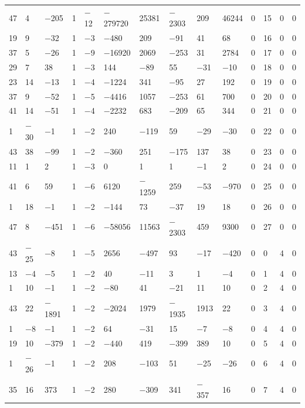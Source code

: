 \documentclass[10pt,a4paper]{amsart}
\numberwithin{equation}{section}
\theoremstyle{definition}
\numberwithin{table}{section}
\begin{document}
{\begin{paracol}{3}
\begin{supertabular}{|w{c}{.32cm}w{c}{.32cm}w{c}{.32cm}@{\hspace{.5cm}}w{c}{.2cm}w{c}{.2cm}|@{\hspace{\tabcolsep}}HHHHHHw{c}{.17cm}w{c}{.17cm}w{c}{.17cm}|}
			47 & 4 & $-$205 & 1 & $-$12 & $-$279720 & 25381 & $-$2303 & 209 & 46244 & 0 & 15 & 0 & 0 \\
			19 & 9 & $-$32 & 1 & $-$3 & $-$480 & 209 & $-$91 & 41 & 68 & 0 & 16 & 0 & 0 \\
			37 & 5 & $-$26 & 1 & $-$9 & $-$16920 & 2069 & $-$253 & 31 & 2784 & 0 & 17 & 0 & 0 \\
			29 & 7 & 38 & 1 & $-$3 & 144 & $-$89 & 55 & $-$31 & $-$10 & 0 & 18 & 0 & 0 \\
			23 & 14 & $-$13 & 1 & $-$4 & $-$1224 & 341 & $-$95 & 27 & 192 & 0 & 19 & 0 & 0 \\
			37 & 9 & $-$52 & 1 & $-$5 & $-$4416 & 1057 & $-$253 & 61 & 700 & 0 & 20 & 0 & 0 \\
			41 & 14 & $-$51 & 1 & $-$4 & $-$2232 & 683 & $-$209 & 65 & 344 & 0 & 21 & 0 & 0 \\
			1 & $-$30 & $-$1 & 1 & $-$2 & 240 & $-$119 & 59 & $-$29 & $-$30 & 0 & 22 & 0 & 0 \\
			43 & 38 & $-$99 & 1 & $-$2 & $-$360 & 251 & $-$175 & 137 & 38 & 0 & 23 & 0 & 0 \\
			11 & 1 & 2 & 1 & $-$3 & 0 & 1 & 1 & $-$1 & 2 & 0 & 24 & 0 & 0 \\
			41 & 6 & 59 & 1 & $-$6 & 6120 & $-$1259 & 259 & $-$53 & $-$970 & 0 & 25 & 0 & 0 \\
			1 & 18 & $-$1 & 1 & $-$2 & $-$144 & 73 & $-$37 & 19 & 18 & 0 & 26 & 0 & 0 \\
			47 & 8 & $-$451 & 1 & $-$6 & $-$58056 & 11563 & $-$2303 & 459 & 9300 & 0 & 27 & 0 & 0 \\
			43 & $-$25 & $-$8 & 1 & $-$5 & 2656 & $-$497 & 93 & $-$17 & $-$420 & 0 & 0 & 4 & 0 \\
			13 & $-$4 & $-$5 & 1 & $-$2 & 40 & $-$11 & 3 & 1 & $-$4 & 0 & 1 & 4 & 0 \\
			1 & 10 & $-$1 & 1 & $-$2 & $-$80 & 41 & $-$21 & 11 & 10 & 0 & 2 & 4 & 0 \\
			43 & 22 & $-$1891 & 1 & $-$2 & $-$2024 & 1979 & $-$1935 & 1913 & 22 & 0 & 3 & 4 & 0 \\
			1 & $-$8 & $-$1 & 1 & $-$2 & 64 & $-$31 & 15 & $-$7 & $-$8 & 0 & 4 & 4 & 0 \\
			19 & 10 & $-$379 & 1 & $-$2 & $-$440 & 419 & $-$399 & 389 & 10 & 0 & 5 & 4 & 0 \\
			1 & $-$26 & $-$1 & 1 & $-$2 & 208 & $-$103 & 51 & $-$25 & $-$26 & 0 & 6 & 4 & 0 \\
			35 & 16 & 373 & 1 & $-$2 & 280 & $-$309 & 341 & $-$357 & 16 & 0 & 7 & 4 & 0 \\

\end{supertabular}
\end{paracol}}
\end{document}
